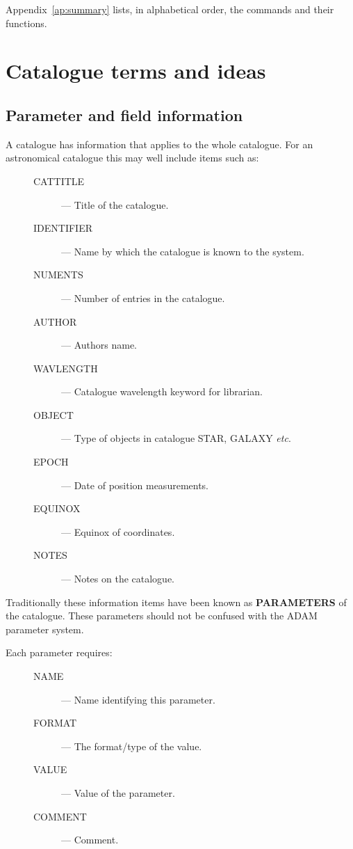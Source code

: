 Appendix~\ref{ap:summary} lists, in alphabetical order, the commands and 
their functions.

\section {Catalogue terms and ideas}

\subsection {Parameter and field information}

A catalogue has information that applies to the  whole catalogue. For an
astronomical catalogue this may well include items such as:
 
\begin{description}
\item[\mbox{}]\mbox{}
\begin{description}
\item [CATTITLE] --- Title of the catalogue.
\item [IDENTIFIER] --- Name by which the catalogue is known to the system.
\item [NUMENTS] --- Number of entries in the catalogue.
\item [AUTHOR] --- Authors name.
\item [WAVLENGTH] --- Catalogue wavelength keyword for librarian.
\item [OBJECT] --- Type of objects in catalogue STAR, GALAXY {\em etc}.
\item [EPOCH] --- Date of position measurements.
\item [EQUINOX] --- Equinox of coordinates.
\item [NOTES] --- Notes on the catalogue.
\end{description}
\end{description}

Traditionally these information items have been known as {\bf PARAMETERS} of 
the catalogue. These parameters should not be confused with the {\small ADAM}
parameter system.

Each parameter requires:

\begin{description}
\item[\mbox{}]\mbox{}
\begin{description}
\item [NAME] --- Name identifying this parameter.
\item [FORMAT] --- The format/type of the value.
\item [VALUE] --- Value of the parameter.
\item [COMMENT] --- Comment.
\end{description}
\end{description}


